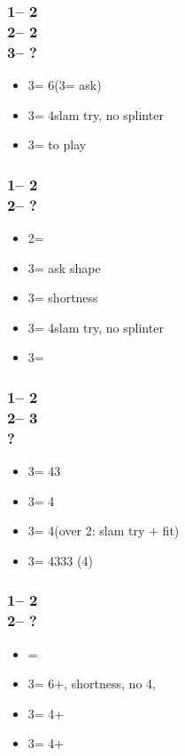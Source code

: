 \documentclass[12pt, a4paper]{article}
\begin{document}
\subsubsection*{1\nt -- 2\clubs\\
                2\hearts -- 2\spades\\
                3\clubs -- ?}
\begin{itemize}
    \item 3\diams = 6\spades (3\hearts = ask)
    \item 3\hearts = 4\hearts slam try, no splinter
    \item 3\nt = to play
\end{itemize}

\subsubsection*{1\nt -- 2\clubs\\
                2\spades -- ?}
\begin{itemize}
    \item 2\nt = \inv
    \item 3\clubs = ask shape
    \item 3\diams = \minor shortness
    \item 3\hearts = 4\spades slam try, no splinter
    \item 3\spades = \inv
\end{itemize}

\subsubsection*{1\nt -- 2\clubs\\
                2\major -- 3\clubs\\
                ?}
\begin{itemize}
    \item 3\diams = 43\minor
    \item 3\hearts = 4\clubs
    \item 3\spades = 4\diams (over 2\spades: slam try + fit)
    \item 3\nt = 4333 (4\major)
\end{itemize}

\subsubsection*{1\nt -- 2\clubs\\
                2\nt -- ?}
\begin{itemize}
    \item \pass = \inv\ \bal
    \item 3\clubs = 6+\diams, \clubs shortness, no 4\major, \gf
    \item 3\diams = 4+\hearts
    \item 3\hearts = 4+\spades
\end{itemize}
\end{document}
